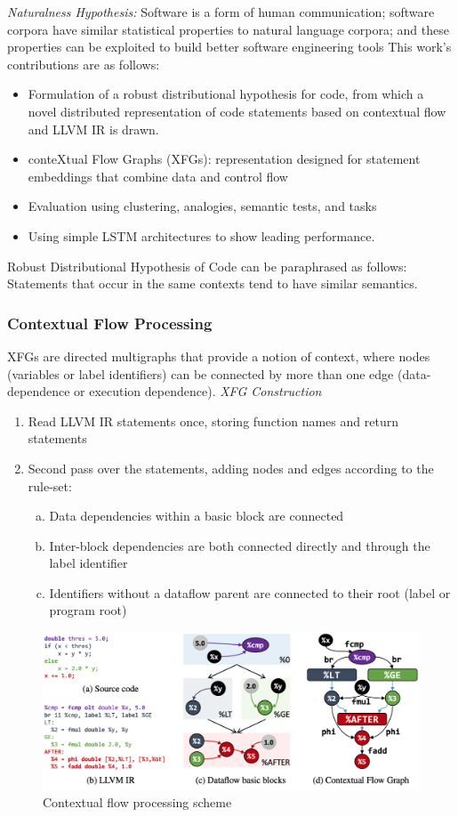 \documentclass{article}
\begin{document}
\textit{Naturalness Hypothesis: } Software is a form of human communication; software corpora have similar statistical properties to natural language corpora; and these properties can be exploited to build better software engineering tools
This work's contributions are as follows:
\begin{itemize}
    \item Formulation of a robust distributional hypothesis for code, from which a novel distributed representation of code statements based on contextual flow and LLVM IR is drawn.
    \item conteXtual Flow Graphs (XFGs): representation designed for statement embeddings that combine data and control flow
    \item Evaluation using clustering, analogies, semantic tests, and tasks
    \item Using simple LSTM architectures to show leading performance.
\end{itemize}
Robust Distributional Hypothesis of Code can be paraphrased as follows: Statements that occur in the same contexts tend to have similar semantics.
\subsubsection{Contextual Flow Processing}
XFGs are directed multigraphs that provide a notion of context, where nodes (variables or label identifiers) can be connected by more than one edge (data-dependence or execution dependence). 
\textit{XFG Construction}
\begin{enumerate}
    \item Read LLVM IR statements once, storing function names and return statements
    \item Second pass over the statements, adding nodes and edges according to the rule-set:
        \begin{enumerate}[(a)]
            \item Data dependencies within a basic block are connected
            \item Inter-block dependencies are both connected directly and through the label identifier 
            \item Identifiers without a dataflow parent are connected to their root (label or program root)
        \end{enumerate}
\end{enumerate}
\begin{figure}[ht]
    \centerline{\includegraphics[width=\columnwidth]{Images/Similarity4-2.png}}
    \caption{Contextual flow processing scheme}
\end{figure}
\end{document}

